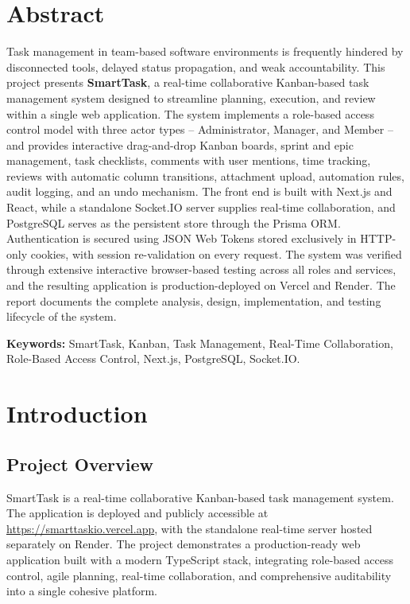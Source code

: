 \documentclass[12pt,a4paper]{report}
\begin{document}
\tableofcontents
\listoffigures
\listoftables

\chapter*{Abstract}
Task management in team-based software environments is frequently hindered by
disconnected tools, delayed status propagation, and weak accountability. This
project presents \textbf{SmartTask}, a real-time collaborative Kanban-based task
management system designed to streamline planning, execution, and review within a
single web application. The system implements a role-based access control model
with three actor types -- Administrator, Manager, and Member -- and provides
interactive drag-and-drop Kanban boards, sprint and epic management, task
checklists, comments with user mentions, time tracking, reviews with automatic
column transitions, attachment upload, automation rules, audit logging, and an
undo mechanism. The front end is built with Next.js and React, while a standalone
Socket.IO server supplies real-time collaboration, and PostgreSQL serves as the
persistent store through the Prisma ORM. Authentication is secured using JSON Web
Tokens stored exclusively in HTTP-only cookies, with session re-validation on
every request. The system was verified through extensive interactive browser-based
testing across all roles and services, and the resulting application is
production-deployed on Vercel and Render. The report documents the complete
analysis, design, implementation, and testing lifecycle of the system.

\noindent\textbf{Keywords:} SmartTask, Kanban, Task Management, Real-Time
Collaboration, Role-Based Access Control, Next.js, PostgreSQL, Socket.IO.

\chapter{Introduction}

\section{Project Overview}
SmartTask is a real-time collaborative Kanban-based task management system. The
application is deployed and publicly accessible at
\url{https://smarttaskio.vercel.app}, with the standalone real-time server hosted
separately on Render. The project demonstrates a production-ready web application
built with a modern TypeScript stack, integrating role-based access control,
agile planning, real-time collaboration, and comprehensive auditability into a
single cohesive platform.
\end{document}
